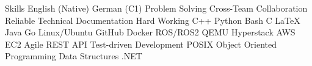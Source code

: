 
\begin{rubric}{Skills}
\entry*[Languages]
	\skilldotfirst English (Native) \skilldot German (C1)
\entry*[Strengths] 
	\skilldotfirst Problem Solving \skilldot Cross-Team Collaboration \skilldot Reliable \newline \skilldotfirst Technical Documentation \skilldot Hard Working %
\entry*[Coding]
	\skilldotfirst C++ \skilldot Python \skilldot Bash \skilldot C \skilldot LaTeX \skilldot Java \skilldot Go
\entry*[Software] 
	\skilldotfirst Linux/Ubuntu \skilldot GitHub \skilldot Docker \skilldot ROS/ROS2 \skilldot QEMU \newline \skilldotfirst Hyperstack \skilldot AWS EC2
\entry*[Knowledge] 	
	\skilldotfirst Agile \skilldot REST API \skilldot Test-driven Development \skilldot POSIX  \newline \skilldotfirst Object Oriented Programming \skilldot Data Structures \skilldot .NET

\end{rubric}
